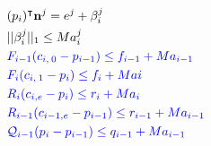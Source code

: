 \begin{align}
                                    \quad & \quad \quad (p_i)^{\intercal} \textbf{n}^j = e^j + \beta_i^j \nonumber\\
                                    \quad & \quad \quad ||\beta_i^j||_1 \leq M a_i^j \nonumber\\
                                    \quad & \quad \quad \textcolor{blue}{F_{i-1} (c_{i,\:0}-p_{i-1}) \leq  f_{i-1} + M a_{i-1} } \nonumber\\
                                    \quad & \quad \quad \textcolor{blue}{F_{i} (c_{i,\:1}-p_{i}) \leq  f_{i} + M a{i} }  \nonumber\\
                                    \quad & \quad \quad \textcolor{blue}{R_{i} (c_{i,e} - p_{i}) \leq r_i + M a_i }  \nonumber\\
                                    \quad & \quad \quad \textcolor{blue}{R_{i-1} (c_{i-1,e} - p_{i-1}) \leq r_{i-1} + M a_{i-1} } \nonumber\\
                                    \quad & \quad \quad \textcolor{blue}{\mathcal{Q}_{i-1} (p_i - p_{i-1}) \leq q_{i-1} + M a_{i-1}} \nonumber
\end{align}